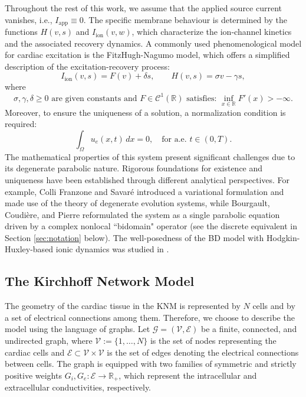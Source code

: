 \documentclass[a4paper,11pt]{article}
\theoremstyle{definition}
\numberwithin{equation}{section}
\newcommand{\R}{\mathbb{R}}
\newcommand{\V}{\mathcal{V}}
\begin{document}
Throughout the rest of this work, we assume that the applied source current vanishes, i.e., $I_\text{app} \equiv 0$. The specific membrane behaviour is determined by the functions $H(v, s)$ and $I_{\text{ion}}(v, w)$, which characterize the ion-channel kinetics and the associated recovery dynamics. A commonly used phenomenological model for cardiac excitation is the FitzHugh-Nagumo model, which offers a simplified description of the excitation-recovery process:
\begin{equation}
	\label{eq:FHN}
	I_{\text{ion}}(v, s) = F(v)+ \delta s, \qquad H(v,s) = \sigma v-\gamma s,
\end{equation}
where 
\begin{equation}
	\label{eq:assumption_F}
	\sigma, \gamma, \delta \geq 0 \text{ are given constants and }F \in \mathcal{C}^1(\R) \text{ satisfies: }\inf_{x \in \R} F'(x)> -\infty.
\end{equation}
Moreover, to ensure the uniqueness of a solution, a normalization condition is required:
\begin{equation}
	\label{eq:zeromean}
	\int_{\Omega} u_e(x, t) \, dx = 0, \quad \text{for a.e. } t \in (0,T).
\end{equation}
The mathematical properties of this system present significant challenges due to its degenerate parabolic nature. Rigorous foundations for existence and uniqueness have been established through different analytical perspectives. For example, Colli Franzone and Savar\'e \cite{CFS02} introduced a variational formulation and made use of the theory of degenerate evolution systems, while Bourgault, Coudi\`ere, and Pierre \cite{BCP09} reformulated the system as a single parabolic equation driven by a complex nonlocal ``bidomain" operator (see the discrete equivalent in Section \ref{sec:notation} below). The well-posedness of the BD model with Hodgkin-Huxley-based ionic dynamics was studied in \cite{V09}. 

\subsection{The Kirchhoff Network Model}
The geometry of the cardiac tissue in the KNM is represented by $N$ cells and by a set of electrical connections among them. Therefore, we choose to describe the model using the language of graphs. Let $\mathcal{G}=(\V,\mathcal{E})$ be a finite, connected, and undirected graph, where $\V := \{1, \dots, N\}$ is the set of nodes representing the cardiac cells and $\mathcal{E} \subset \V \times \V$ is the set of edges denoting the electrical connections between cells. The graph is equipped with two families of symmetric and strictly positive weights $G_i,G_e : \mathcal{E}\to\R_+$, which represent the intracellular and extracellular conductivities, respectively. 
\end{document}

